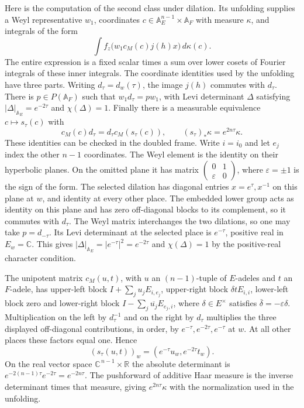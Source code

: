 Here is the computation of the second class under dilation. Its
unfolding supplies a Weyl representative \(w_1\), coordinates
\(c\in\mathbb A_E^{n-1}\times\mathbb A_F\) with measure \(\kappa\),
and integrals of the form
\[
 \int f_z\bigl(w_1 c_M(c)j(h)x\bigr)\,d\kappa(c).
\]
The entire expression is a fixed scalar times a sum over lower
cosets of Fourier integrals of these inner integrals. The
coordinate identities used by the unfolding have three parts.
Writing \(d_\tau=d_w(\tau)\), the image \(j(h)\) commutes with
\(d_\tau\). There is \(p\in P(\mathbb A_F)\) such that
\(w_1d_\tau=pw_1\), with Levi determinant \(\Delta\) satisfying
\(|\Delta|_{\mathbb A_E}=e^{-2\tau}\) and \(\chi(\Delta)=1\).
Finally there is a measurable equivalence \(c\mapsto s_\tau(c)\)
with
\[
 c_M(c)d_\tau=d_\tau c_M(s_\tau(c)),\qquad
               (s_\tau)_*\kappa=e^{2n\tau}\kappa .
\]
These identities can be checked in the doubled frame. Write
\(i=i_0\) and let \(e_j\) index the other \(n-1\) coordinates.
The Weyl element is the identity on their hyperbolic planes. On the omitted plane it has matrix
\(\left(\begin{smallmatrix}0&1\\ \varepsilon&0\end{smallmatrix}\right)\),
where \(\varepsilon=\pm1\) is the sign of the form. The selected
dilation has diagonal entries \(x=e^\tau,x^{-1}\) on this plane
at \(w\), and identity at every other place. The embedded lower
group acts as identity on this plane and has zero off-diagonal
blocks to its complement, so it commutes with \(d_\tau\).
The Weyl matrix interchanges the two dilations, so one may
take \(p=d_{-\tau}\). Its Levi determinant at the selected place is
\(e^{-\tau}\), positive real in \(E_w=\mathbb C\). This gives
\(|\Delta|_{\mathbb A_E}=|e^{-\tau}|^2=e^{-2\tau}\)
and \(\chi(\Delta)=1\) by the positive-real character condition.

The unipotent matrix \(c_M(u,t)\), with \(u\) an \((n-1)\)-tuple
of \(E\)-adeles and \(t\) an \(F\)-adele, has upper-left block
\(I+\sum_j u_j E_{i,e_j}\), upper-right block
\(\delta t E_{i,i}\), lower-left block zero and lower-right block
\(I-\sum_j\overline{u_j}E_{e_j,i}\), where
\(\delta\in E^\times\) satisfies
\(\overline{\delta}=-\varepsilon\delta\).
Multiplication on the left by \(d_\tau^{-1}\) and on the right
by \(d_\tau\) multiplies the three displayed off-diagonal
contributions, in order, by \(e^{-\tau},e^{-2\tau},e^{-\tau}\)
at \(w\). At all other places these factors equal one. Hence
\[
 (s_\tau(u,t))_w=(e^{-\tau}u_w,e^{-2\tau}t_w).
\]
On the real vector space \(\mathbb C^{\,n-1}\times\mathbb R\)
the absolute determinant is
\(e^{-2(n-1)\tau}e^{-2\tau}=e^{-2n\tau}\).
The pushforward of additive Haar measure is the inverse
determinant times that measure, giving \(e^{2n\tau}\kappa\)
with the normalization used in the unfolding.

